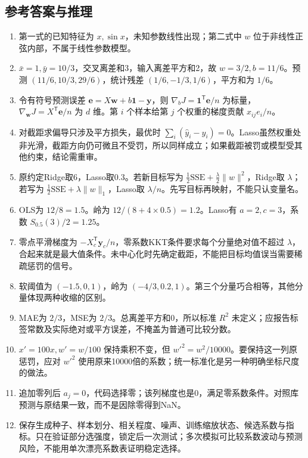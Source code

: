 \documentclass[UTF8,fontset=none,zihao=-4,a4paper]{ctexart}
\numberwithin{equation}{section}
\numberwithin{figure}{section}
\begin{document}
\clearpage
\subsection{参考答案与推理}
\begin{enumerate}[label=11.\arabic*,before={\interlinepenalty=10000}]
\item 第一式的已知特征为 $x,\sin x$，未知参数线性出现；第二式中 $w$ 位于非线性正弦内部，不属于线性参数模型。
\item $\bar x=1,\bar y=10/3$，交叉离差和3，输入离差平方和2，故 $w=3/2,b=11/6$。预测 $(11/6,10/3,29/6)$，统计残差 $(1/6,-1/3,1/6)$，平方和为 $1/6$。
\item 令有符号预测误差 $\symbf e=X\symbf w+b\symbf1-\symbf y$，则 $\nabla_bJ=\symbf1^{\mathsf T}\symbf e/n$ 为标量，$\nabla_{\symbf w}J=X^{\mathsf T}\symbf e/n$ 为 $d$ 维。第 $i$ 个样本给第 $j$ 个权重的梯度贡献 $x_{ij}e_i/n$。
\item 对截距求偏导只涉及平方损失，最优时 $\sum_i(\widehat y_i-y_i)=0$。Lasso虽然权重处非光滑，截距方向仍可微且不受罚，所以同样成立；如果截距被罚或模型受其他约束，结论需重审。
\item 原约定Ridge取6，Lasso取0.3。若新目标写为 $\tfrac12\mathrm{SSE}+\tfrac\lambda2\|w\|^2$，Ridge取 $\lambda$；若写为 $\tfrac12\mathrm{SSE}+\lambda\|w\|_1$，Lasso取 $\lambda/n$。先写目标再映射，不能只认变量名。
\item OLS为 $12/8=1.5$。岭为 $12/(8+4\times0.5)=1.2$。Lasso有 $a=2,c=3$，系数 $S_{0.5}(3)/2=1.25$。
\item 零点平滑梯度为 $-X_c^{\mathsf T}\symbf y_c/n$，零系数KKT条件要求每个分量绝对值不超过 $\lambda$，合起来就是最大值条件。未中心化时先确定截距，不能把目标均值误当需要稀疏惩罚的信号。
\item 软阈值为 $(-1.5,0,1)$，岭为 $(-4/3,0.2,1)$。第三个分量巧合相等，其他分量体现两种收缩的区别。
\item MAE为 $2/3$，MSE为 $2/3$。总离差平方和0，所以标准 $R^2$ 未定义；应报告标签常数及实际绝对或平方误差，不掩盖为普通可比较分数。
\item $x'=100x,w'=w/100$ 保持乘积不变，但 $w'^2=w^2/10000$。要保持这一列原惩罚，应对 $w'^2$ 使用原来10000倍的系数；统一标准化是另一种明确坐标尺度的做法。
\item 追加零列后 $a_j=0$，代码选择零；该列梯度也是0，满足零系数条件。对照库预测与原结果一致，而不是因除零得到NaN。
\item 保存生成种子、样本划分、相关程度、噪声、训练缩放状态、候选系数与指标。只在验证部分选强度，锁定后一次测试；多次模拟可比较系数波动与预测风险，不能用单次漂亮系数表证明稳定选择。
\end{enumerate}
\end{document}
